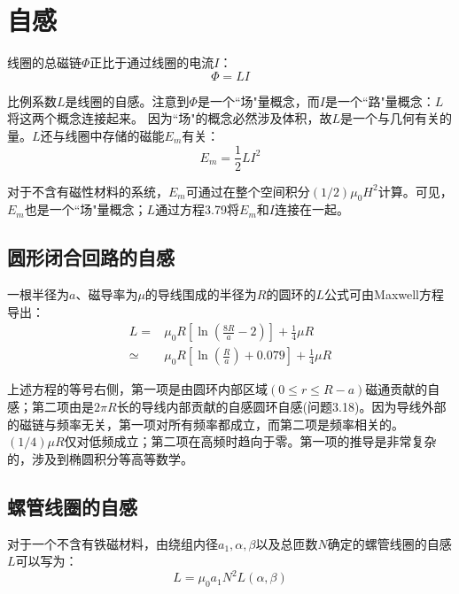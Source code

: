 \section{自感}
线圈的总磁链$\Phi$正比于通过线圈的电流$I$：
\begin{equation}
 \Phi=LI %
\end{equation}

比例系数$L$是线圈的自感。注意到$\Phi$是一个``场"量概念，而$I$是一个``路"量概念：$L$将这两个概念连接起来。
因为``场"的概念必然涉及体积，故$L$是一个与几何有关的量。$L$还与线圈中存储的磁能$E_m$有关：
\begin{equation}
 E_m=\frac{1}{2}LI^2 %
\end{equation}

对于不含有磁性材料的系统，$E_m$可通过在整个空间积分$(1/2)\mu_0 H^2$计算。可见，$E_m$也是一个``场"量概念；$L$通过方程3.79将$E_m$和$I$连接在一起。

\subsection{圆形闭合回路的自感}
一根半径为$a$、磁导率为$\mu$的导线围成的半径为$R$的圆环的$L$公式可由Maxwell方程导出：
\begin{subequations}
	\begin{align}
L=&\mu_0R\left[\ln(\frac{8R}{a}-2)\right]+\frac{1}{4}\mu R \\
\simeq & \mu_0R\left[\ln(\frac{R}{a})+0.079\right]+\frac{1}{4}\mu R%
	\end{align}
\end{subequations}

上述方程的等号右侧，第一项是由圆环内部区域$(0\le r \le R-a)$磁通贡献的自感；第二项由是$2\pi R$长的导线内部贡献的自感圆环自感(问题3.18)。因为导线外部的磁链与频率无关，第一项对所有频率都成立，而第二项是频率相关的。$(1/4)\mu R$仅对低频成立；第二项在高频时趋向于零。第一项的推导是非常复杂的，涉及到椭圆积分等高等数学。

\subsection{螺管线圈的自感}
对于一个不含有铁磁材料，由绕组内径$a_1,\alpha,\beta$以及总匝数$N$确定的螺管线圈的自感$L$可以写为：
\begin{equation}
L=\mu_0a_1N^2L(\alpha,\beta)%
\end{equation}

